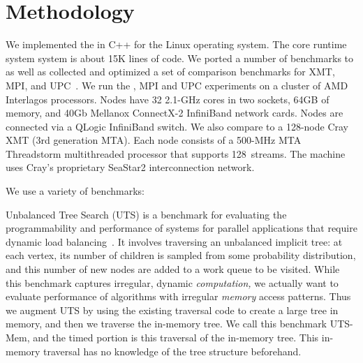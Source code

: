 \section{Methodology} \label{sec:method}

We implemented the \Grappa in C++ for the Linux operating system. The core
runtime system system is about 15K lines of code. We ported a number of
benchmarks to \Grappa as well as collected and optimized a set of comparison
benchmarks for XMT, MPI, and UPC~\cite{UPC}. We run the \Grappa, MPI and UPC
experiments on a cluster of AMD Interlagos processors. Nodes have 32 2.1-GHz
cores in two sockets, 64GB of memory, and 40Gb Mellanox ConnectX-2 InfiniBand
network cards. Nodes are connected via a QLogic InfiniBand switch. We also
compare \Grappa to a 128-node Cray XMT (3rd generation MTA). Each node
consists of a 500-MHz MTA Threadstorm multithreaded processor that supports
128~streams. The machine uses Cray's proprietary SeaStar2 interconnection
network. 

We use a variety of benchmarks:

% 

\vspace{0.5ex}
 Unbalanced Tree Search
(UTS) is a benchmark for evaluating the programmability and performance of
systems for parallel applications that require dynamic load
balancing~\cite{UTS}. It involves traversing an unbalanced implicit tree: at
each vertex, its number of children is sampled from some probability
distribution, and this number of new nodes are added to a work queue to be
visited. While this benchmark captures irregular, dynamic \emph{computation,}
we actually want to evaluate performance of algorithms with irregular
\emph{memory\/} access patterns. Thus we augment UTS by using the existing
traversal code to create a large tree in memory, and then we traverse the
in-memory tree. We call this benchmark UTS-Mem, and the timed portion is this
traversal of the in-memory tree. This in-memory traversal has no knowledge of
the tree structure beforehand.


